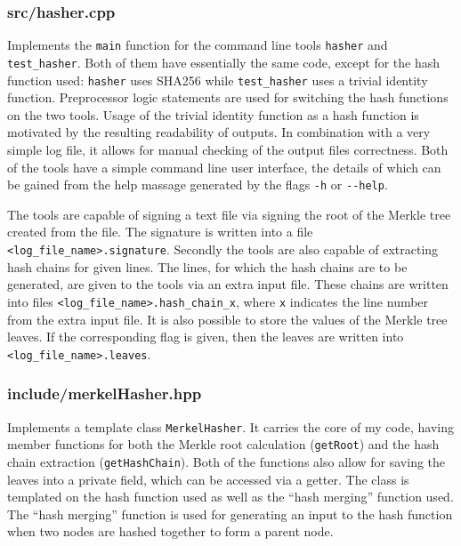 \documentclass[11pt]{article}
\newcommand{\ct}[1]{\texttt{#1}}
\begin{document}
\subsubsection*{src/hasher.cpp} %
\label{ssub:src_hasher_cpp}

Implements the \ct{main} function for the command line tools \ct{hasher} and \ct{test\_hasher}. Both of them have essentially the same code, except for the hash function used: \ct{hasher} uses SHA256 while \ct{test\_hasher} uses a trivial identity function. Preprocessor logic statements are used for switching the hash functions on the two tools. Usage of the trivial identity function as a hash function is motivated by the resulting readability of outputs. In combination with a very simple log file, it allows for manual checking of the output files correctness. Both of the tools have a simple command line user interface, the details of which can be gained from the help massage generated by the flags \ct{-h} or \ct{-{}-help}. 

The tools are capable of signing a text file via signing the root of the Merkle tree created from the file. The signature is written into a file \ct{<log\_file\_name>.signature}. Secondly the tools are also capable of extracting hash chains for given lines. The lines, for which the hash chains are to be generated, are given to the tools via an extra input file. These chains are written into files \ct{<log\_file\_name>.hash\_chain\_x}, where \ct{x} indicates the line number from the extra input file. It is also possible to store the values of the Merkle tree leaves. If the corresponding flag is given, then the leaves are written into \ct{<log\_file\_name>.leaves}.  


\subsubsection*{include/merkelHasher.hpp} %
\label{ssub:include_merkelhasher_hpp}

Implements a template class \ct{MerkelHasher}. It carries the core of my code, having member functions for both the Merkle root calculation (\ct{getRoot}) and the hash chain extraction (\ct{getHashChain}). Both of the functions also allow for saving the leaves into a private field, which can be accessed via a getter. The class is templated on the hash function used as well as the ``hash merging'' function used. The ``hash merging'' function is used for generating an input to the hash function when two nodes are hashed together to form a parent node.     
\end{document}
